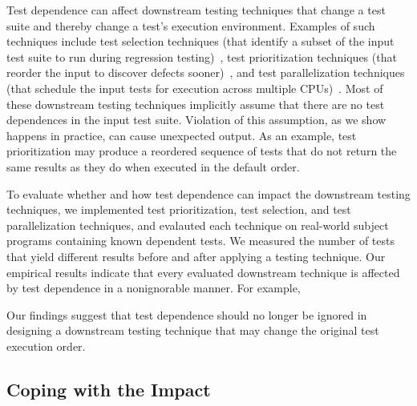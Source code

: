 Test dependence can affect downstream testing
techniques that change a test suite and thereby change a test's
execution environment. 
Examples of such techniques include
test selection techniques (that identify a subset of the input
test suite to run during regression testing)~\cite{harroldetal:OOPSLA:2001, Orso:2004:SRT,
Briand:2009:ART, Zhang:2012:RMT, Nanda:2011:RTP, hsu09may},
test prioritization techniques (that reorder the input to
discover defects sooner)~\cite{Elbaum:2000:PTC:347324.348910,
Kim:2002:HTP:581339.581357, Rummel:2005:TPR:1066677.1067016, Srivastava:2002:EPT:566172.566187, Jiang:2009:ART},
and test parallelization
techniques (that schedule the input tests for execution across
multiple CPUs)~\cite{Misailovic:2007, Kim:2013:OUT}.
%
Most of these downstream testing techniques implicitly
assume that there are no test dependences in the input test
suite. Violation of this assumption, as we show happens in
practice, can cause unexpected output. As an example, test
prioritization may produce a reordered sequence of tests that
do not return the same results as they do when executed in
the default order.

To evaluate whether and how test dependence can impact
the downstream testing techniques, we implemented \prionum
test prioritization, \selnum test selection, and \parnum test
parallelization techniques, and evalauted each technique
on \subjnum real-world subject programs containing known dependent tests.
We measured the number of tests that yield different
results before and after applying a testing technique.
Our empirical results indicate that 
every evaluated downstream technique is affected by 
test dependence in a nonignorable manner. For example,

Our findings suggest that test dependence should no longer
be ignored in designing a downstream testing technique that
may change the original test execution order.



\subsection{Coping with the Impact}



